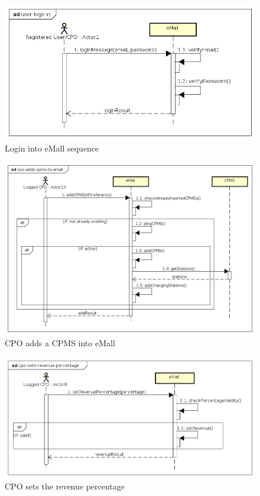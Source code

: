 \begin{figure}[!h]
    \begin{center}
        \includegraphics[keepaspectratio, width=16cm]{Sequence/user-logs-in.png}
        \caption{Login into \ac{eMall} sequence}
    \end{center}
\end{figure}
\begin{figure}[!h]
    \begin{center}
        \includegraphics[keepaspectratio, width=16cm]{Sequence/cpo-adds-cpms-to-emall.png}
        \caption{\ac{CPO} adds a \ac{CPMS} into eMall}
    \end{center}
\end{figure}
\begin{figure}[!h]
    \begin{center}
        \includegraphics[keepaspectratio, width=16cm]{Sequence/cpo-sets-revenue-percentage.png}
        \caption{\ac{CPO} sets the revenue percentage}
    \end{center}
\end{figure}

